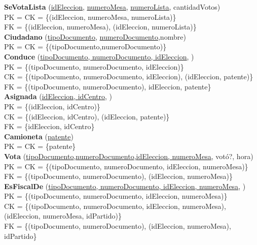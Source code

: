 \documentclass[10pt,a4paper]{article}
\begin{document}
\textbf{SeVotaLista}
(\underline{\underline{idEleccion}}, \underline{\underline{numeroMesa}}, \underline{\underline{numeroLista}}, cantidadVotos)\\
PK = CK = \{(idEleccion, numeroMesa, numeroLista)\}\\
FK = \{(idEleccion, numeroMesa), (idEleccion, numeroLista)\}\\

\textbf{Ciudadano}
(\underline{tipoDocumento}, \underline{numeroDocumento},nombre)\\
PK = CK = \{(tipoDocumento,numeroDocumento)\}\\

\textbf{Conduce}
(\underline{\underline{tipoDocumento}, \underline{numeroDocumento}, \underline{idEleccion}}, )\\
PK = \{(tipoDocumento, numeroDocumento, idEleccion)\}\\
CK = \{(tipoDocumento, numeroDocumento, idEleccion), (idEleccion, patente)\}\\
FK = \{(tipoDocumento, numeroDocumento), idEleccion, patente\}\\

\textbf{Asignada}
(\underline{\underline{idEleccion}, \underline{idCentro}}, )\\
PK = \{(idEleccion, idCentro)\}\\
CK = \{(idEleccion, idCentro), (idEleccion, patente)\}\\
FK = \{idEleccion, idCentro\}\\

\textbf{Camioneta}
(\underline{patente})\\
PK = CK = \{patente\}\\

\textbf{Vota}
(\underline{\underline{tipoDocumento}},\underline{numeroDocumento},\underline{\underline{idEleccion}, \underline{numeroMesa}}, votó?, hora)\\
PK = CK = \{(tipoDocumento, numeroDocumento, idEleccion, numeroMesa)\}\\
FK = \{(tipoDocumento, numeroDocumento), (idEleccion, numeroMesa)\}\\

\textbf{EsFiscalDe}
(\underline{\underline{tipoDocumento}, \underline{numeroDocumento},
\underline{idEleccion},
\underline{numeroMesa}}, )\\
PK = \{(tipoDocumento, numeroDocumento, idEleccion, numeroMesa)\}\\
CK = \{(tipoDocumento, numeroDocumento, idEleccion, numeroMesa),(idEleccion, numeroMesa, idPartido)\}\\
FK = \{(tipoDocumento, numeroDocumento), (idEleccion, numeroMesa), idPartido\}\\
\end{document}
